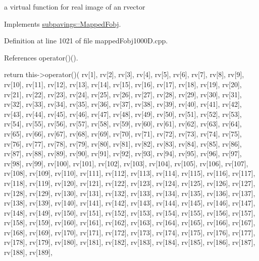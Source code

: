 a virtual function for real image of an rvector 



\-Implements \hyperlink{classsubpavings_1_1MappedFobj_aed79714dcf7fb4eb54d0488428909291}{subpavings\-::\-Mapped\-Fobj}.



\-Definition at line 1021 of file mapped\-Fobj1000\-D.\-cpp.



\-References operator()().


\begin{DoxyCode}
{
  return this->operator()(
    rv[1],
  rv[2],
  rv[3],
  rv[4],
  rv[5],
  rv[6],
  rv[7],
  rv[8],
  rv[9],
  rv[10],
  rv[11],
  rv[12],
  rv[13],
  rv[14],
  rv[15],
  rv[16],
  rv[17],
  rv[18],
  rv[19],
  rv[20],
  rv[21],
  rv[22],
  rv[23],
  rv[24],
  rv[25],
  rv[26],
  rv[27],
  rv[28],
  rv[29],
  rv[30],
  rv[31],
  rv[32],
  rv[33],
  rv[34],
  rv[35],
  rv[36],
  rv[37],
  rv[38],
  rv[39],
  rv[40],
  rv[41],
  rv[42],
  rv[43],
  rv[44],
  rv[45],
  rv[46],
  rv[47],
  rv[48],
  rv[49],
  rv[50],
  rv[51],
  rv[52],
  rv[53],
  rv[54],
  rv[55],
  rv[56],
  rv[57],
  rv[58],
  rv[59],
  rv[60],
  rv[61],
  rv[62],
  rv[63],
  rv[64],
  rv[65],
  rv[66],
  rv[67],
  rv[68],
  rv[69],
  rv[70],
  rv[71],
  rv[72],
  rv[73],
  rv[74],
  rv[75],
  rv[76],
  rv[77],
  rv[78],
  rv[79],
  rv[80],
  rv[81],
  rv[82],
  rv[83],
  rv[84],
  rv[85],
  rv[86],
  rv[87],
  rv[88],
  rv[89],
  rv[90],
  rv[91],
  rv[92],
  rv[93],
  rv[94],
  rv[95],
  rv[96],
  rv[97],
  rv[98],
  rv[99],
  rv[100],
  rv[101],
  rv[102],
  rv[103],
  rv[104],
  rv[105],
  rv[106],
  rv[107],
  rv[108],
  rv[109],
  rv[110],
  rv[111],
  rv[112],
  rv[113],
  rv[114],
  rv[115],
  rv[116],
  rv[117],
  rv[118],
  rv[119],
  rv[120],
  rv[121],
  rv[122],
  rv[123],
  rv[124],
  rv[125],
  rv[126],
  rv[127],
  rv[128],
  rv[129],
  rv[130],
  rv[131],
  rv[132],
  rv[133],
  rv[134],
  rv[135],
  rv[136],
  rv[137],
  rv[138],
  rv[139],
  rv[140],
  rv[141],
  rv[142],
  rv[143],
  rv[144],
  rv[145],
  rv[146],
  rv[147],
  rv[148],
  rv[149],
  rv[150],
  rv[151],
  rv[152],
  rv[153],
  rv[154],
  rv[155],
  rv[156],
  rv[157],
  rv[158],
  rv[159],
  rv[160],
  rv[161],
  rv[162],
  rv[163],
  rv[164],
  rv[165],
  rv[166],
  rv[167],
  rv[168],
  rv[169],
  rv[170],
  rv[171],
  rv[172],
  rv[173],
  rv[174],
  rv[175],
  rv[176],
  rv[177],
  rv[178],
  rv[179],
  rv[180],
  rv[181],
  rv[182],
  rv[183],
  rv[184],
  rv[185],
  rv[186],
  rv[187],
  rv[188],
  rv[189],
}
\end{DoxyCode}
